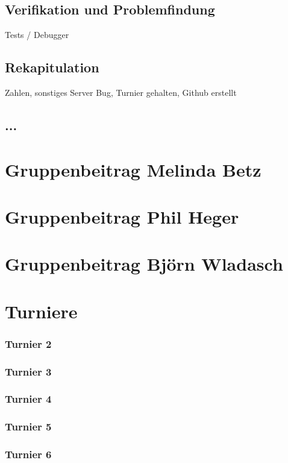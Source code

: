 \documentclass[runningheads]{llncs}
\begin{document}
\subsection{Verifikation und Problemfindung}\label{verifikation}
Tests / Debugger

\subsection{Rekapitulation}
Zahlen, sonstiges Server Bug, Turnier gehalten, Github erstellt

\subsection{...}

\section{Gruppenbeitrag Melinda Betz}

\section{Gruppenbeitrag Phil Heger}

\section{Gruppenbeitrag Björn Wladasch}

\section{Turniere}
\subsubsection{Turnier 2}
\subsubsection{Turnier 3}
\subsubsection{Turnier 4}
\subsubsection{Turnier 5}
\subsubsection{Turnier 6}
\end{document}
